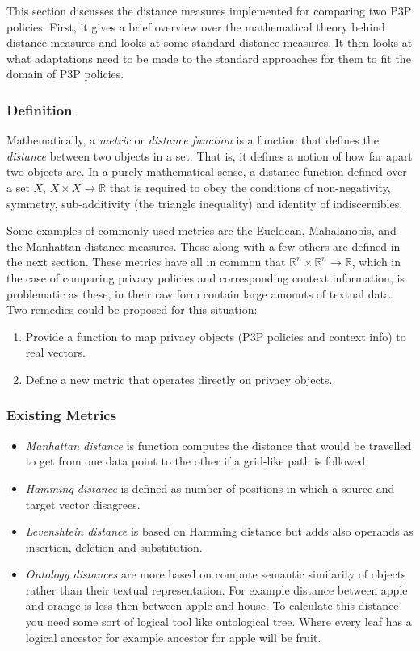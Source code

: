 This section discusses the distance measures implemented for comparing two P3P policies. First, it gives a brief overview over the mathematical theory behind distance measures and looks at some standard distance measures. It then looks at what adaptations need to be made to the standard approaches for them to fit the domain of P3P policies.

\subsubsection{Definition}

Mathematically, a \emph{metric} or \emph{distance function} is a function that defines the \emph{distance} between two objects in a set. That is, it defines a notion of how far apart two objects are. In a purely mathematical sense, a distance function defined over a set $X$, $X\times X\longrightarrow \mathbb{R}$ that is required to obey the conditions of non-negativity, symmetry, sub-additivity (the triangle inequality) and identity of indiscernibles. 

Some examples of commonly used metrics are the Eucldean, Mahalanobis, and the Manhattan distance measures. These along with a few others are defined in the next section. These metrics have all in common that $\mathbb{R}^n\times \mathbb{R}^n\longrightarrow \mathbb{R}$, which in the case of comparing privacy policies and corresponding context information, is problematic as these, in their raw form contain large amounts of textual data. Two remedies could be proposed for this situation:

\begin{enumerate}
\item Provide a function to map privacy objects (P3P policies and context info) to real vectors.
\item Define a new metric that operates directly on privacy objects.
\end{enumerate}

\subsubsection{Existing Metrics}

\begin{itemize}
\item \emph{Manhattan distance} is function computes the distance that would be travelled to get from one data point to the other if a grid-like path is followed. 
\item \emph{Hamming distance} is defined as number of positions in which a source and target vector disagrees.
\item \emph{Levenshtein distance} is based on Hamming distance but adds also operands as insertion, deletion and substitution. 
\item \emph{Ontology distances} are more based on compute semantic similarity of objects rather than their textual representation. For example distance between apple and orange is less then between apple and house. To calculate this distance you need some sort of logical tool like ontological tree. Where every leaf has a logical ancestor for example ancestor for apple will be fruit.
\end{itemize}

